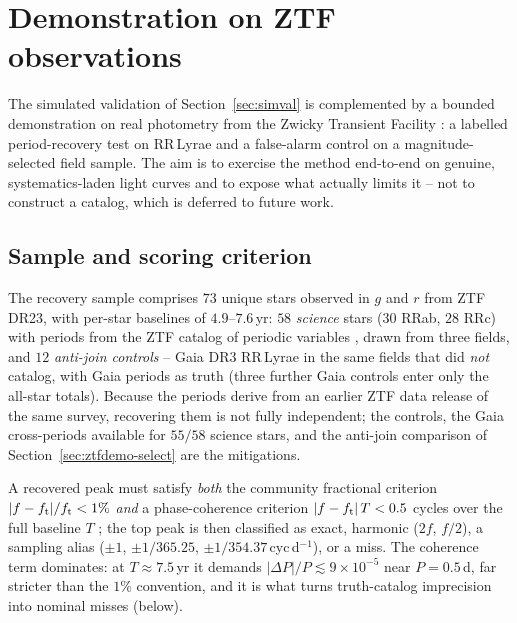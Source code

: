 \documentclass[apj]{emulateapj}
\begin{document}
\section{Demonstration on ZTF observations}\label{sec:ztfdemo}

The simulated validation of Section~\ref{sec:simval} is complemented by a
bounded demonstration on real photometry from the Zwicky Transient Facility
\citep[ZTF;][]{Bellm_etal_2019}: a labelled period-recovery test on RR\,Lyrae
and a false-alarm control on a magnitude-selected field sample.  The aim is to
exercise the method end-to-end on genuine, systematics-laden light curves and
to expose what actually limits it -- not to construct a catalog, which is
deferred to future work.

\subsection{Sample and scoring criterion}
\label{sec:ztfdemo-sample}

The recovery sample comprises $73$ unique stars observed in $g$ and $r$ from
ZTF DR23, with per-star baselines of $4.9$--$7.6$\,yr: $58$ \emph{science}
stars ($30$ RRab, $28$ RRc) with periods from the ZTF catalog of periodic
variables \citep[][DR2-derived]{Chen_etal_2020}, drawn from three fields, and
$12$ \emph{anti-join controls} -- Gaia DR3 RR\,Lyrae
\citep{Clementini_etal_2023} in the same fields that \citet{Chen_etal_2020}
did \emph{not} catalog, with Gaia periods as truth (three further Gaia controls
enter only the all-star totals).  Because the \citet{Chen_etal_2020} periods
derive from an earlier ZTF data release of the same survey, recovering them is
not fully independent; the controls, the Gaia cross-periods available for
$55/58$ science stars, and the anti-join comparison of
Section~\ref{sec:ztfdemo-select} are the mitigations.

A recovered peak must satisfy \emph{both} the community fractional criterion
$|f-f_{\rm t}|/f_{\rm t} < 1\%$ \citep{Stringer_et_al_2019} \emph{and} a
phase-coherence criterion $|f-f_{\rm t}|\,T < 0.5$ cycles over the full
baseline $T$ \citep{Graham_etal_2013}; the top peak is then classified as
exact, harmonic ($2f$, $f/2$), a sampling alias ($\pm1$, $\pm1/365.25$,
$\pm1/354.37$\,cyc\,d$^{-1}$), or a miss.  The coherence term dominates: at
$T\approx7.5$\,yr it demands $|\Delta P|/P \lesssim 9\times10^{-5}$ near
$P=0.5$\,d, far stricter than the $1\%$ convention, and it is what turns
truth-catalog imprecision into nominal misses (below).
\end{document}
